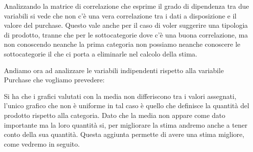 \documentclass{article}
\begin{document}
Analizzando la matrice di correlazione che esprime il grado di dipendenza tra due variabili si vede che non c'è una vera correlazione tra i dati a disposizione e il valore del purchase.
Questo vale anche per il caso di voler suggerire una tipologia di prodotto, tranne che per le sottocategorie dove c'è una buona correlazione, ma non conoscendo neanche la prima categoria non possiamo neanche conoscere le sottocategorie il che ci porta a eliminarle nel calcolo della stima.

\begin{figure}[htp!]
\centering
{}
\end{figure}

Andiamo ora ad analizzare le variabili indipendenti rispetto alla variabile Purchase che vogliamo prevedere:
\begin{figure}[htp!]
\centering
{}
\end{figure}

Si ha che i grafici valutati con la media non differiscono tra i valori assegnati, l'unico grafico che non è uniforme in tal caso è quello che definisce la quantità del prodotto rispetto alla categoria.
Dato che la media non appare come dato importante ma la loro quantità si, per migliorare la stima andremo anche a tener conto della sua quantità. Questa aggiunta permette di avere una stima migliore, come vedremo in seguito.
\end{document}
